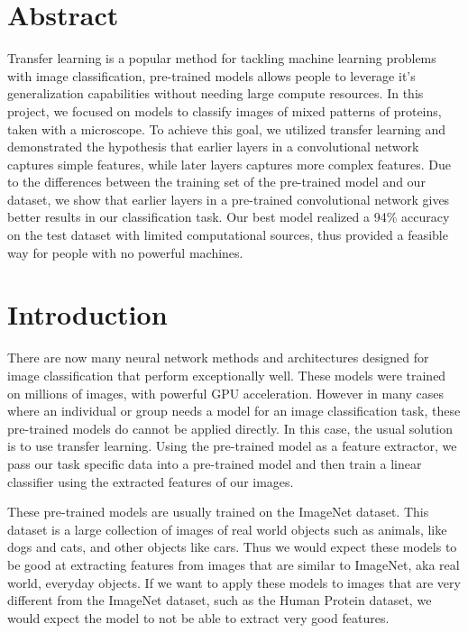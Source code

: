 \documentclass{article}
\begin{document}
\section*{Abstract}
Transfer learning is a popular method for tackling machine learning problems with image classification, 
pre-trained models allows people to leverage it's generalization capabilities without needing large compute 
resources. In this project, we focused on models to classify images of mixed patterns of proteins,
taken with a microscope. To achieve this goal, we utilized transfer learning 
and demonstrated the hypothesis that earlier layers in a convolutional network captures simple features,
while later layers captures more complex features. Due to the differences between the training set
of the pre-trained model and our dataset, we show that earlier layers in a pre-trained convolutional network
gives better results in our classification task. Our best model realized a 94\% accuracy on 
the test dataset with limited computational sources, thus provided a feasible way for people with 
no powerful machines.
\section{Introduction}
There are now many neural network methods and architectures designed for 
image classification that perform exceptionally well. These models were trained
on millions of images, with powerful GPU acceleration. However in many cases where
an individual or group needs a model for an image classification task, these pre-trained
models do cannot be applied directly. In this case, the usual solution is to use transfer learning.
Using the pre-trained model as a feature extractor, we pass our task specific data into a 
pre-trained model and then train a linear classifier using the extracted features of our images.

These pre-trained models are usually trained on the ImageNet dataset\cite{imagenet_cvpr09}. This dataset is a large
collection of images of real world objects such as animals, like dogs and cats, and other objects like cars.
Thus we would expect these models to be good at extracting features from images that are similar to ImageNet,
aka real world, everyday objects. If we want to apply these models to images that are very different from 
the ImageNet dataset, such as the Human Protein dataset, we would expect the model to 
not be able to extract very good features.
\end{document}
